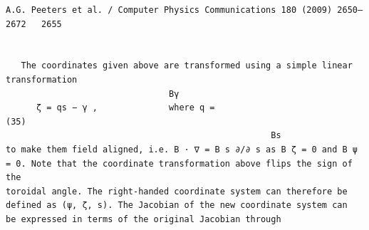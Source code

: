 \documentclass[a4paper]{article}
\newcommand{\gkwpagefont}{\fontsize{6.0pt}{7.55pt}\selectfont}
\begin{document}
\newpage
\begin{Verbatim}[fontsize=\gkwpagefont]
                                                                  A.G. Peeters et al. / Computer Physics Communications 180 (2009) 2650–2672   2655


   The coordinates given above are transformed using a simple linear transformation
                                Bγ
      ζ = qs − γ ,              where q =                                                                                                      (35)
                                                    Bs
to make them field aligned, i.e. B · ∇ = B s ∂/∂ s as B ζ = 0 and B ψ = 0. Note that the coordinate transformation above flips the sign of the
toroidal angle. The right-handed coordinate system can therefore be defined as (ψ, ζ, s). The Jacobian of the new coordinate system can
be expressed in terms of the original Jacobian through
                                     

\end{Verbatim}
\end{document}
